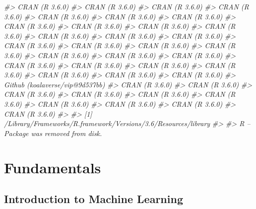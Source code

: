 \documentclass[]{krantz}
\makeatletter
\newenvironment{Shaded}{\begin{snugshade}}{\end{snugshade}}
\newcommand{\CommentTok}[1]{\textcolor[rgb]{0.37,0.37,0.37}{\textit{#1}}}
\newenvironment{kframe}{%
\medskip{}
\setlength{\fboxsep}{.8em}
 \def\at@end@of@kframe{}%
 \ifinner\ifhmode%
  \def\at@end@of@kframe{\end{minipage}}%
  \begin{minipage}{\columnwidth}%
 \fi\fi%
 \def\FrameCommand##1{\hskip\@totalleftmargin \hskip-\fboxsep
 \colorbox{shadecolor}{##1}\hskip-\fboxsep
     \hskip-\linewidth \hskip-\@totalleftmargin \hskip\columnwidth}%
 \MakeFramed {\advance\hsize-\width
   \@totalleftmargin\z@ \linewidth\hsize
   \@setminipage}}%
 {\par\unskip\endMakeFramed%
 \at@end@of@kframe}
\renewenvironment{Shaded}{\begin{kframe}}{\end{kframe}}
\makeatother
\begin{document}
\begin{Shaded}
\begin{Highlighting}[]
\CommentTok{#>  CRAN (R 3.6.0)                 }
\CommentTok{#>  CRAN (R 3.6.0)                 }
\CommentTok{#>  CRAN (R 3.6.0)                 }
\CommentTok{#>  CRAN (R 3.6.0)                 }
\CommentTok{#>  CRAN (R 3.6.0)                 }
\CommentTok{#>  CRAN (R 3.6.0)                 }
\CommentTok{#>  CRAN (R 3.6.0)                 }
\CommentTok{#>  CRAN (R 3.6.0)                 }
\CommentTok{#>  CRAN (R 3.6.0)                 }
\CommentTok{#>  CRAN (R 3.6.0)                 }
\CommentTok{#>  CRAN (R 3.6.0)                 }
\CommentTok{#>  CRAN (R 3.6.0)                 }
\CommentTok{#>  CRAN (R 3.6.0)                 }
\CommentTok{#>  CRAN (R 3.6.0)                 }
\CommentTok{#>  CRAN (R 3.6.0)                 }
\CommentTok{#>  CRAN (R 3.6.0)                 }
\CommentTok{#>  CRAN (R 3.6.0)                 }
\CommentTok{#>  CRAN (R 3.6.0)                 }
\CommentTok{#>  CRAN (R 3.6.0)                 }
\CommentTok{#>  CRAN (R 3.6.0)                 }
\CommentTok{#>  CRAN (R 3.6.0)                 }
\CommentTok{#>  CRAN (R 3.6.0)                 }
\CommentTok{#>  CRAN (R 3.6.0)                 }
\CommentTok{#>  CRAN (R 3.6.0)                 }
\CommentTok{#>  CRAN (R 3.6.0)                 }
\CommentTok{#>  CRAN (R 3.6.0)                 }
\CommentTok{#>  CRAN (R 3.6.0)                 }
\CommentTok{#>  CRAN (R 3.6.0)                 }
\CommentTok{#>  Github (koalaverse/vip@9d537bb)}
\CommentTok{#>  CRAN (R 3.6.0)                 }
\CommentTok{#>  CRAN (R 3.6.0)                 }
\CommentTok{#>  CRAN (R 3.6.0)                 }
\CommentTok{#>  CRAN (R 3.6.0)                 }
\CommentTok{#>  CRAN (R 3.6.0)                 }
\CommentTok{#>  CRAN (R 3.6.0)                 }
\CommentTok{#>  CRAN (R 3.6.0)                 }
\CommentTok{#>  CRAN (R 3.6.0)                 }
\CommentTok{#>  CRAN (R 3.6.0)                 }
\CommentTok{#>  CRAN (R 3.6.0)                 }
\CommentTok{#> }
\CommentTok{#> [1] /Library/Frameworks/R.framework/Versions/3.6/Resources/library}
\CommentTok{#> }
\CommentTok{#>  R -- Package was removed from disk.}
\end{Highlighting}
\end{Shaded}

\mainmatter

\hypertarget{part-fundamentals}{%
\part{Fundamentals}\label{part-fundamentals}}

\hypertarget{intro}{%
\chapter{Introduction to Machine Learning}\label{intro}}
\end{document}
